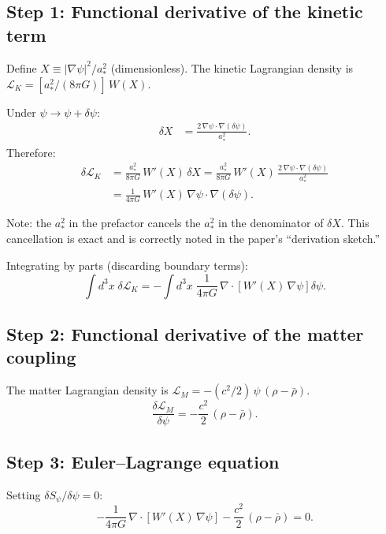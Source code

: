 \documentclass[aps,prd,twocolumn,nofootinbib]{revtex4-2}
\begin{document}
\subsection{Step 1: Functional derivative of the kinetic term}

Define $X \equiv |\nabla\psi|^2/a_*^2$ (dimensionless). The kinetic
Lagrangian density is $\mathcal{L}_K = [a_*^2/(8\pi G)]\,W(X)$.

Under $\psi \to \psi + \delta\psi$:
\begin{align}
\delta X &= \frac{2\,\nabla\psi\cdot\nabla(\delta\psi)}{a_*^2}.
\end{align}
Therefore:
\begin{align}
\delta\mathcal{L}_K &= \frac{a_*^2}{8\pi G}\,W'(X)\,\delta X
= \frac{a_*^2}{8\pi G}\,W'(X)\,\frac{2\,\nabla\psi\cdot\nabla(\delta\psi)}{a_*^2}
\nonumber\\
&= \frac{1}{4\pi G}\,W'(X)\,\nabla\psi\cdot\nabla(\delta\psi).
\label{eq:dLK}
\end{align}

Note: the $a_*^2$ in the prefactor cancels the $a_*^2$ in the
denominator of $\delta X$. This cancellation is exact and is correctly
noted in the paper's ``derivation sketch.''

Integrating by parts (discarding boundary terms):
\begin{equation}
\int d^3x\;\delta\mathcal{L}_K
= -\int d^3x\;\frac{1}{4\pi G}\,\nabla\cdot\!\left[W'(X)\,\nabla\psi\right]\delta\psi.
\label{eq:var-kinetic}
\end{equation}

\subsection{Step 2: Functional derivative of the matter coupling}

The matter Lagrangian density is $\mathcal{L}_M = -(c^2/2)\,\psi\,(\rho - \bar\rho)$.
\begin{equation}
\frac{\delta\mathcal{L}_M}{\delta\psi} = -\frac{c^2}{2}\,(\rho - \bar\rho).
\label{eq:var-matter}
\end{equation}

\subsection{Step 3: Euler--Lagrange equation}

Setting $\delta S_\psi/\delta\psi = 0$:
\begin{equation}
-\frac{1}{4\pi G}\,\nabla\cdot\!\left[W'(X)\,\nabla\psi\right]
- \frac{c^2}{2}\,(\rho - \bar\rho) = 0.
\end{equation}
\end{document}

